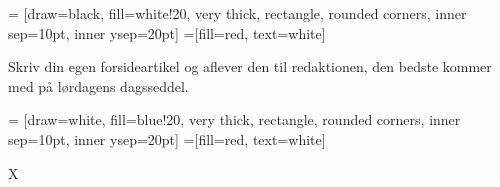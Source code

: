 

\begin{minipage}[b]{0.95\linewidth}
\begin{minipage}[t]{0.47\textwidth}
\vspace{3mm}

 = [draw=black, fill=white!20, very thick,
    rectangle, rounded corners, inner sep=10pt, inner ysep=20pt]
 =[fill=red, text=white]

%

Skriv din egen forsideartikel og aflever den til redaktionen, den bedste kommer med på lørdagens dagsseddel.

\end{minipage}
\hfill\begin{minipage}[t]{0.47\textwidth}

\vspace{1mm}
 = [draw=white, fill=blue!20, very thick,
    rectangle, rounded corners, inner sep=10pt, inner ysep=20pt]
 =[fill=red, text=white]

%

X

\end{minipage}
\end{minipage}
